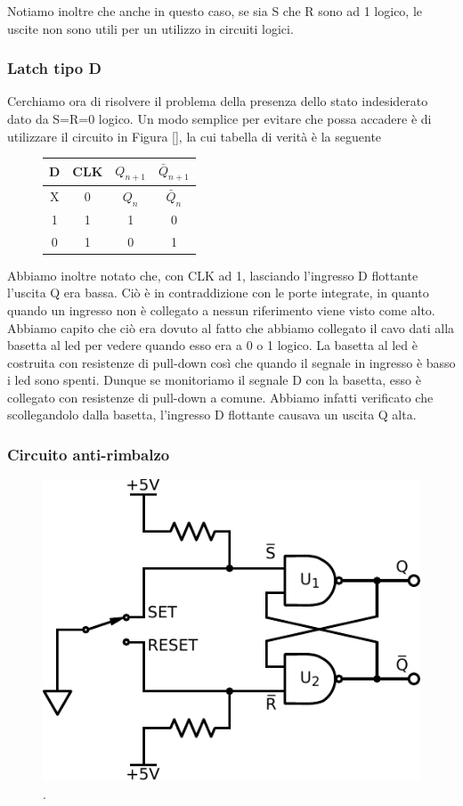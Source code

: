 Notiamo inoltre che anche in questo caso, se sia S che R sono ad 1 logico, le uscite non sono utili per un utilizzo in circuiti logici.

\subsubsection*{Latch tipo D}

Cerchiamo ora di risolvere il problema della presenza dello stato indesiderato dato da S=R=0 logico. Un modo semplice per evitare che possa accadere è di utilizzare il circuito in Figura \ref{}, la cui tabella di verità è la seguente

\begin{figure}[H]
		\centering
		{\renewcommand{\arraystretch}{1.1}%
		\begin{tabular}{|c|c|c|c|}
		\hline
		D & CLK & $Q_{n+1}$ & $\bar Q_{n+1}$  \\
		\hline
		X & 0  & $Q_n$ & $\bar Q_n$\\
		\hline
		 1&1 & 1 & 0\\
		\hline
		0&1 & 0  &1\\
		\hline
		\end{tabular}}
		\label{tab11:Latch_D}
        \end{figure}

Abbiamo inoltre notato che, con CLK ad 1, lasciando l'ingresso D flottante l'uscita Q era bassa. Ciò è in contraddizione con le porte integrate, in quanto quando un ingresso non è collegato a nessun riferimento viene visto come alto. Abbiamo capito che ciò era dovuto al fatto che abbiamo collegato il cavo dati alla basetta al led per vedere quando esso era a 0 o 1 logico. La basetta al led è costruita con resistenze di pull-down così che quando il segnale in ingresso è basso i led sono spenti. Dunque se monitoriamo il segnale D con la basetta, esso è collegato con resistenze di pull-down a comune. Abbiamo infatti verificato che scollegandolo dalla basetta, l'ingresso D flottante causava un uscita Q alta.

\subsubsection*{Circuito anti-rimbalzo}


\begin{figure}
\centering
\includegraphics[width=.25\textwidth]{../E11/latex/anti-rimbalzo.pdf}
\caption{.}
\label{cir11:no-rimb}
\end{figure}

